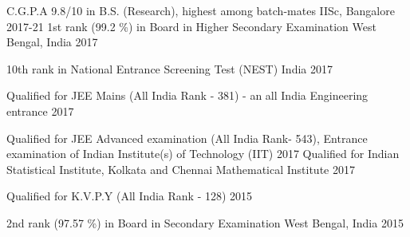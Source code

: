 




\begin{cvhonors}

  \cvhonor
{C.G.P.A} %
{9.8/10 in B.S. (Research), highest among batch-mates} %
{IISc, Bangalore} %
{2017-21} %
  \cvhonor
    {1st rank (99.2 \%) in Board} %
    {in Higher Secondary Examination} %
    {West Bengal, India} %
    {2017} %

  \cvhonor
    {} %
    {10th rank in National Entrance Screening Test (NEST)} %
    {India} %
    {2017} %

  \cvhonor
	{} %
	{Qualified for JEE Mains (All India Rank - 381) - an all India Engineering entrance} %
	{} %
	{2017} %
	 
	\cvhonor
	{} %
	{Qualified for JEE Advanced examination (All India Rank- 543), Entrance examination of Indian Institute(s) of Technology (IIT)} %
	{} %
	{2017} %
  \cvhonor
    {} %
    {Qualified for Indian Statistical Institute, Kolkata and Chennai Mathematical Institute} %
    {} %
    {2017} %

  \cvhonor
    {} %
    {Qualified for K.V.P.Y (All India Rank - 128)} %
    {} %
    {2015} %

  \cvhonor
    {2nd rank (97.57 \%) in Board} %
    {in Secondary Examination} %
    {West Bengal, India} %
    {2015} %
    \\\\

\end{cvhonors}

